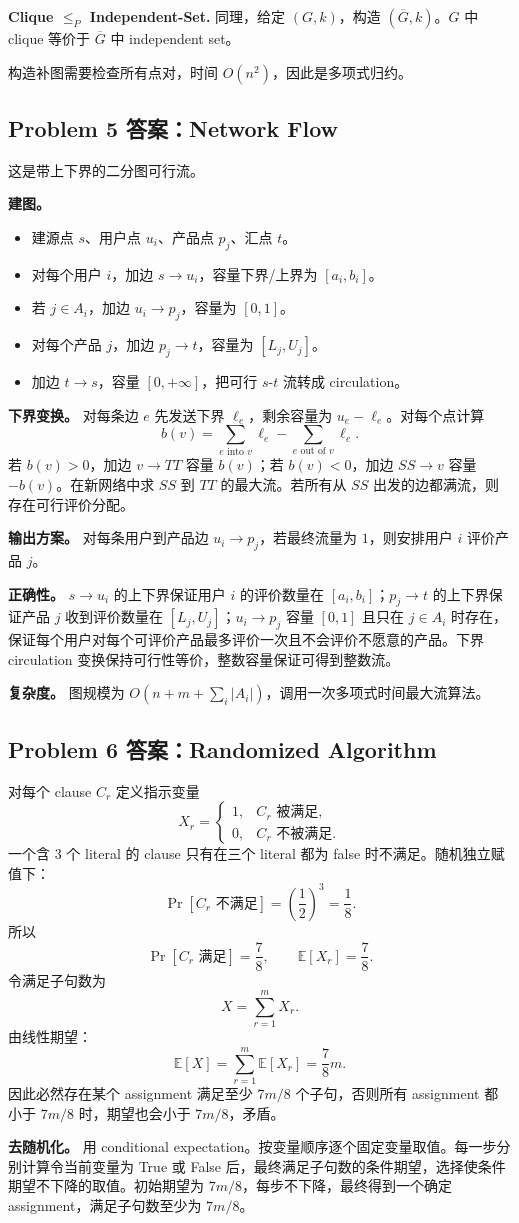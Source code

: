 \documentclass[UTF8,a4paper,11pt]{ctexart}
\begin{document}
\textbf{Clique $\le_P$ Independent-Set.} 同理，给定 $(G,k)$，构造 $(\overline G,k)$。$G$ 中 clique 等价于 $\overline G$ 中 independent set。

构造补图需要检查所有点对，时间 $O(n^2)$，因此是多项式归约。

\subsection*{Problem 5 答案：Network Flow}

这是带上下界的二分图可行流。

\textbf{建图。}
\begin{itemize}
  \item 建源点 $s$、用户点 $u_i$、产品点 $p_j$、汇点 $t$。
  \item 对每个用户 $i$，加边 $s\to u_i$，容量下界/上界为 $[a_i,b_i]$。
  \item 若 $j\in A_i$，加边 $u_i\to p_j$，容量为 $[0,1]$。
  \item 对每个产品 $j$，加边 $p_j\to t$，容量为 $[L_j,U_j]$。
  \item 加边 $t\to s$，容量 $[0,+\infty]$，把可行 $s$-$t$ 流转成 circulation。
\end{itemize}

\textbf{下界变换。} 对每条边 $e$ 先发送下界 $\ell_e$，剩余容量为 $u_e-\ell_e$。对每个点计算
\[
b(v)=\sum_{e\text{ into }v}\ell_e-\sum_{e\text{ out of }v}\ell_e.
\]
若 $b(v)>0$，加边 $v\to TT$ 容量 $b(v)$；若 $b(v)<0$，加边 $SS\to v$ 容量 $-b(v)$。在新网络中求 $SS$ 到 $TT$ 的最大流。若所有从 $SS$ 出发的边都满流，则存在可行评价分配。

\textbf{输出方案。} 对每条用户到产品边 $u_i\to p_j$，若最终流量为 $1$，则安排用户 $i$ 评价产品 $j$。

\textbf{正确性。} $s\to u_i$ 的上下界保证用户 $i$ 的评价数量在 $[a_i,b_i]$；$p_j\to t$ 的上下界保证产品 $j$ 收到评价数量在 $[L_j,U_j]$；$u_i\to p_j$ 容量 $[0,1]$ 且只在 $j\in A_i$ 时存在，保证每个用户对每个可评价产品最多评价一次且不会评价不愿意的产品。下界 circulation 变换保持可行性等价，整数容量保证可得到整数流。

\textbf{复杂度。} 图规模为 $O(n+m+\sum_i |A_i|)$，调用一次多项式时间最大流算法。

\subsection*{Problem 6 答案：Randomized Algorithm}

对每个 clause $C_r$ 定义指示变量
\[
X_r=
\begin{cases}
1, & C_r\text{ 被满足},\\
0, & C_r\text{ 不被满足}.
\end{cases}
\]
一个含 3 个 literal 的 clause 只有在三个 literal 都为 false 时不满足。随机独立赋值下：
\[
\Pr[C_r\text{ 不满足}]=\left(\frac12\right)^3=\frac18.
\]
所以
\[
\Pr[C_r\text{ 满足}]=\frac78,\qquad \mathbb E[X_r]=\frac78.
\]
令满足子句数为
\[
X=\sum_{r=1}^m X_r.
\]
由线性期望：
\[
\mathbb E[X]=\sum_{r=1}^m \mathbb E[X_r]=\frac78m.
\]
因此必然存在某个 assignment 满足至少 $7m/8$ 个子句，否则所有 assignment 都小于 $7m/8$ 时，期望也会小于 $7m/8$，矛盾。

\textbf{去随机化。} 用 conditional expectation。按变量顺序逐个固定变量取值。每一步分别计算令当前变量为 True 或 False 后，最终满足子句数的条件期望，选择使条件期望不下降的取值。初始期望为 $7m/8$，每步不下降，最终得到一个确定 assignment，满足子句数至少为 $7m/8$。
\end{document}
